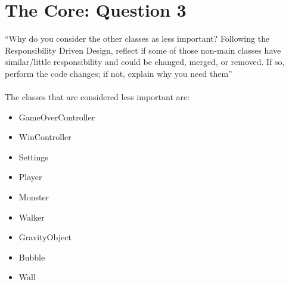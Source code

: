 \chapter{The Core: Question 3}
``Why do you consider the other classes as less important? Following the Responsibility Driven Design,
reflect if some of those non-main classes have similar/little responsibility and could be changed,
merged, or removed. If so, perform the code changes; if not, explain why you need them''\\
\\
The classes that are considered less important are:
\begin{itemize}
	\item GameOverController
	\item WinController
	\item Settings
	\item Player
	\item Monster
	\item Walker
	\item GravityObject
	\item Bubble
	\item Wall
\end{itemize}

